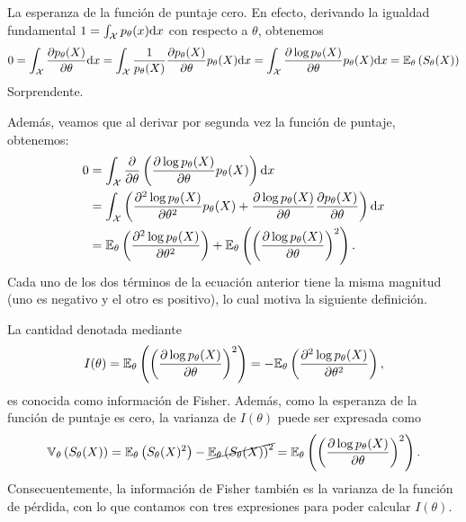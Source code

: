 \begin{remark}
La esperanza de la función de puntaje cero. En efecto, derivando la igualdad fundamental $1 = \int_{\mathcal X} p_\theta(x){\text{d}x}$ con respecto a $\theta$, obtenemos 
\begin{align}
	0 = \int_{\mathcal X} \frac{\partial  p_\theta(X)}{\partial\theta} {\text{d}x} = \int_{\mathcal X} \frac{1}{p_\theta(X)}\frac{\partial  p_\theta(X)}{\partial\theta} p_\theta(X) {\text{d}x} = \int_{\mathcal X} \frac{\partial \log   p_\theta(X)}{\partial\theta} p_\theta(X) {\text{d}x} = \mathbb{E}_\theta \left(S_\theta(X)\right)
\end{align}
Sorprendente. 
\end{remark}

Además, veamos que al derivar por segunda vez la función de puntaje, obtenemos: 
\begin{align*}
	0 &= \int_{\mathcal X} \frac{\partial}{\partial \theta }\left(\frac{\partial \log   p_\theta(X)}{\partial\theta} p_\theta(X) \right){\text{d}x}\\ 
	&= \int_{\mathcal X} \left(\frac{\partial^2 \log   p_\theta(X)}{\partial\theta^2} p_\theta(X) + \frac{\partial \log   p_\theta(X)}{\partial\theta}\frac{\partial   p_\theta(X)}{\partial\theta}  \right){\text{d}x}\\
	&= \mathbb{E}_\theta \left(\frac{\partial^2 \log   p_\theta(X)}{\partial\theta^2}\right) + \mathbb{E}_\theta \left(\left(\frac{\partial \log   p_\theta(X)}{\partial\theta}\right)^2\right).
\end{align*}
Cada uno de los dos términos de la ecuación anterior tiene la misma magnitud (uno es negativo y el otro es positivo), lo cual motiva la siguiente definición.

\begin{definition}
La cantidad denotada mediante  
\begin{equation}
		I(\theta) = \mathbb{E}_\theta \left(\left(\frac{\partial \log   p_\theta(X)}{\partial\theta}\right)^2\right) = 	-\mathbb{E}_\theta \left(\frac{\partial^2 \log   p_\theta(X)}{\partial\theta^2}\right),
\end{equation}	
es conocida como información de Fisher. Además, como la esperanza de la función de puntaje es cero, la varianza de $I(\theta)$ puede ser expresada como 
\begin{equation}
	\mathbb{V}_\theta \left(S_\theta(X)\right) = \mathbb{E}_\theta \left(S_\theta(X)^2\right) - \cancel{\mathbb{E}_\theta \left(S_\theta(X)\right)^2} = \mathbb{E}_\theta \left(\left(\frac{\partial \log   p_\theta(X)}{\partial\theta}\right)^2\right).
\end{equation}
Consecuentemente, la información de Fisher también es la varianza de la función de pérdida, con lo que contamos con tres expresiones para poder calcular $I(\theta)$. 
\end{definition}

